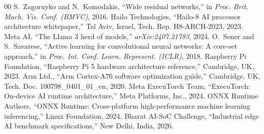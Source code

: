 \documentclass[journal,twocolumn]{IEEEtran}
\begin{document}
\begin{thebibliography}{00}
 S.~Zagoruyko and N.~Komodakis, ``Wide residual networks,'' in \textit{Proc. Brit. Mach. Vis. Conf. (BMVC)}, 2016.
 Hailo Technologies, ``Hailo-8 AI processor architecture whitepaper,'' Tel Aviv, Israel, Tech. Rep. H8-ARCH-2023, 2023.
 Meta AI, ``The Llama 3 herd of models,'' \textit{arXiv:2407.21783}, 2024.
 O.~Sener and S.~Savarese, ``Active learning for convolutional neural networks: A core-set approach,'' in \textit{Proc. Int. Conf. Learn. Represent. (ICLR)}, 2018.
 Raspberry Pi Foundation, ``Raspberry Pi 5 hardware architecture reference,'' Cambridge, UK, 2023.
 Arm Ltd., ``Arm Cortex-A76 software optimization guide,'' Cambridge, UK, Tech. Doc. 100798\_0401\_01\_en, 2020.
 Meta ExecuTorch Team, ``ExecuTorch: On-device AI runtime architecture,'' Meta Platforms, Inc., 2024.
 ONNX Runtime Authors, ``ONNX Runtime: Cross-platform high-performance machine learning inferencing,'' Linux Foundation, 2024.
 Bharat AI-SoC Challenge, ``Industrial edge AI benchmark specifications,'' New Delhi, India, 2026.
\end{thebibliography}
\end{document}
